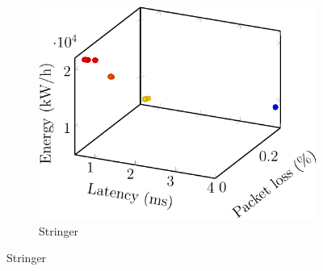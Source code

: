 \begin{enumerate}
\begin{figure}[t!]
                  \begin{subfigure}[b]{0.32\linewidth}
                        \includegraphics[width=\textwidth]{figs/comparison/stringer-crop}
                        \caption{Stringer \cite{TODO}}
                  \end{subfigure}


\end{figure}
\end{enumerate}
